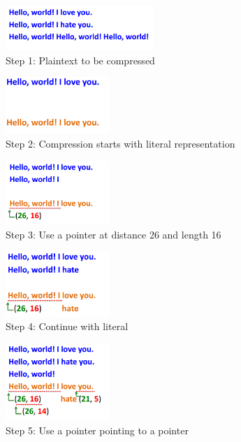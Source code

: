 \begin{figure}[H] \caption{Step 1: Plaintext to be compressed}
\centering
\includegraphics[width=0.5\textwidth]{diagrams/lz77_1.png}\end{figure}
\begin{figure}[H] \caption{Step 2: Compression starts with literal representation}
\centering
\includegraphics[width=0.35\textwidth]{diagrams/lz77_2.png}\end{figure}
\begin{figure}[H] \caption{Step 3: Use a pointer at distance 26 and length 16}
\centering
\includegraphics[width=0.35\textwidth]{diagrams/lz77_3.png}\end{figure}
\begin{figure}[H] \caption{Step 4: Continue with literal} \centering
\includegraphics[width=0.35\textwidth]{diagrams/lz77_4.png}\end{figure}
\begin{figure}[H] \caption{Step 5: Use a pointer pointing to a pointer} \centering
\includegraphics[width=0.35\textwidth]{diagrams/lz77_5.png}\end{figure}
